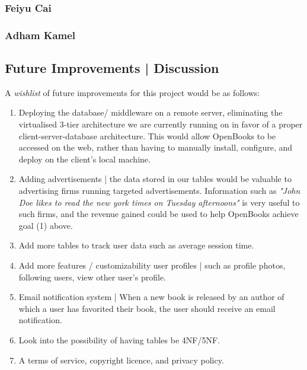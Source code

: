 \documentclass[letter, 12pt, titlepage]{article}
\begin{document}
\subsubsection{Feiyu Cai}

\subsubsection{Adham Kamel}

\subsection{Future Improvements | Discussion}
A \textit{wishlist} of future improvements for this project would be as follows:
\begin{enumerate}
	\item Deploying the database/ middleware on a remote server, eliminating the virtualised 3-tier architecture we are currently running on in favor of a proper client-server-database architecture. This would allow OpenBooks to be accessed on the web, rather than having to manually install, configure, and deploy on the client's local machine.
	\item Adding advertisements | the data stored in our tables would be valuable to advertising firms running targeted advertisements. Information such as \textit{"John Doe likes to read the new york times on Tuesday afternoons"} is very useful to such firms, and the revenue gained could be used to help OpenBooks achieve  goal (1) above.
	\item Add more tables to track user data such as average session time.
	\item Add more features / customizability user profiles |  such as profile photos, following users, view other user's profile.
	\item Email notification system | When a new book is released by an author of which a user has favorited their book, the user should receive an email notification.
	\item Look into the possibility of having tables be 4NF/5NF.
	\item A terms of service, copyright licence, and privacy policy.
\end{enumerate}
\end{document}
